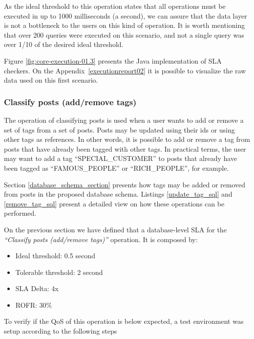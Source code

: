 As the ideal threshold to this operation states that all operations must be executed in up to 1000 milliseconds (a second), we can assure that the data layer is not a bottleneck to the users on this kind of operation. It is worth mentioning that over 200 queries were executed on this scenario, and not a single query was over 1/10 of the desired ideal threshold. 

Figure \ref{fig:core-execution-01.3} presents the Java implementation of SLA checkers. On the Appendix~\ref{executionreport02} it is possible to visualize the raw data used on this first scenario. 

\clearpage
\subsubsection{Classify posts (add/remove tags)}

The operation of classifying posts is used when a user wants to add or remove a set of tags from a set of posts. Posts may be updated using their ids or using other tags as references. In other words, it is possible to add or remove a tag from posts that have already been tagged with other tags. In practical terms, the user may want to add a tag ``SPECIAL\_CUSTOMER'' to posts that already have been tagged as ``FAMOUS\_PEOPLE'' or ``RICH\_PEOPLE'', for example. 

Section \ref{database_schema_section} presents how tags may be added or removed from posts in the proposed database schema. Listings \ref{update_tag_sql} and \ref{remove_tag_sql} present a detailed view on how these operations can be performed. 

On the previous section we have defined that a database-level SLA for the \textit{``Classify posts (add/remove tags)''} operation. It is composed by: 

\begin{itemize}
	\item{Ideal threshold: 0.5 second}
	\item{Tolerable threshold: 2 second}
	\item{SLA Delta: 4x}
	\item{ROFR: 30\%}
\end{itemize}

To verify if the QoS of this operation is below expected, a test environment was setup according to the following steps

